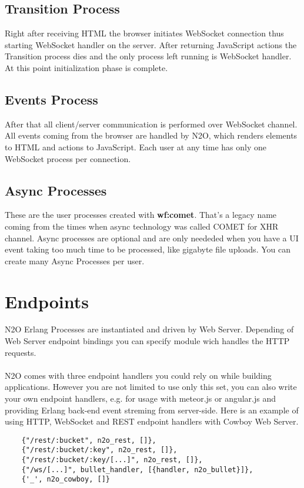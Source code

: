 \subsection{Transition Process}
Right after receiving HTML the browser initiates WebSocket connection
thus starting WebSocket handler on the server. After returning
JavaScript actions the Transition process dies and the only process left
running is WebSocket handler. At this point initialization phase is complete.

\subsection{Events Process}
After that all client/server communication is performed over
WebSocket channel. All events coming from the browser are
handled by N2O, which renders elements to HTML and actions to
JavaScript. Each user at any time has only one WebSocket process
per connection.

\subsection{Async Processes}
These are the user processes created with {\bf wf:comet}.
That's a legacy name coming from the times when async technology
was called COMET for XHR channel. Async processes are optional
and are only neededed when you have a UI event taking too much
time to be processed, like gigabyte file uploads. You can create
many Async Processes per user.

\section{Endpoints}
N2O Erlang Processes are instantiated and driven by Web Server.
Depending of Web Server endpoint bindings you can specify
module wich handles the HTTP requests.

\paragraph{}
N2O comes with three endpoint handlers you could rely on while building
applications. However you are not limited to use only this set,
you can also write your own endpoint handlers, e.g. for usage with
meteor.js or angular.js and providing Erlang back-end event streming
from server-side. Here is an example of using HTTP, WebSocket and
REST endpoint handlers with Cowboy Web Server.

\vspace{1\baselineskip}
\begin{lstlisting}
    {"/rest/:bucket", n2o_rest, []},
    {"/rest/:bucket/:key", n2o_rest, []},
    {"/rest/:bucket/:key/[...]", n2o_rest, []},
    {"/ws/[...]", bullet_handler, [{handler, n2o_bullet}]},
    {'_', n2o_cowboy, []}
\end{lstlisting}

